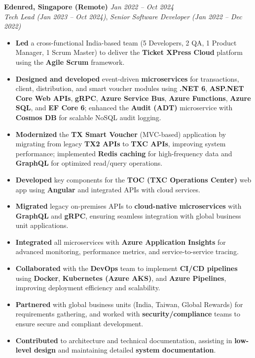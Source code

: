 \documentclass[12pt,a4paper]{article}
\begin{document}
\newline
\textbf{Edenred, Singapore (Remote)} \hfill \textit{Jan 2022 -- Oct 2024}\\
\textit{Tech Lead (Jan 2023 -- Oct 2024)},
\newline
\textit{Senior Software Developer (Jan 2022 -- Dec 2022)}
\begin{itemize}
    \item \textbf{Led} a cross-functional India-based team (5 Developers, 2 QA, 1 Product Manager, 1 Scrum Master) to deliver the \textbf{Ticket XPress Cloud} platform using the \textbf{Agile Scrum} framework.
    \item \textbf{Designed and developed} event-driven \textbf{microservices} for transactions, client, distribution, and smart voucher modules using \textbf{.NET 6}, \textbf{ASP.NET Core Web APIs}, \textbf{gRPC}, \textbf{Azure Service Bus}, \textbf{Azure Functions}, \textbf{Azure SQL}, and \textbf{EF Core 6}; enhanced the \textbf{Audit (ADT)} microservice with \textbf{Cosmos DB} for scalable NoSQL audit logging.
    \item \textbf{Modernized} the \textbf{TX Smart Voucher} (MVC-based) application by migrating from legacy \textbf{TX2 APIs} to \textbf{TXC APIs}, improving system performance; implemented \textbf{Redis caching} for high-frequency data and \textbf{GraphQL} for optimized read/query operations.
    \item \textbf{Developed} key components for the \textbf{TOC (TXC Operations Center)} web app using \textbf{Angular} and integrated APIs with cloud services.
    \item \textbf{Migrated} legacy on-premises APIs to \textbf{cloud-native microservices} with \textbf{GraphQL} and \textbf{gRPC}, ensuring seamless integration with global business unit applications.
    \item \textbf{Integrated} all microservices with \textbf{Azure Application Insights} for advanced monitoring, performance metrics, and service-to-service tracing.
    \item \textbf{Collaborated} with the \textbf{DevOps} team to implement \textbf{CI/CD pipelines} using \textbf{Docker}, \textbf{Kubernetes (Azure AKS)}, and \textbf{Azure Pipelines}, improving deployment efficiency and scalability.
    \item \textbf{Partnered} with global business units (India, Taiwan, Global Rewards) for requirements gathering, and worked with \textbf{security/compliance} teams to ensure secure and compliant development.
    \item \textbf{Contributed} to architecture and technical documentation, assisting in \textbf{low-level design} and maintaining detailed \textbf{system documentation}.

\end{itemize}
\end{document}
